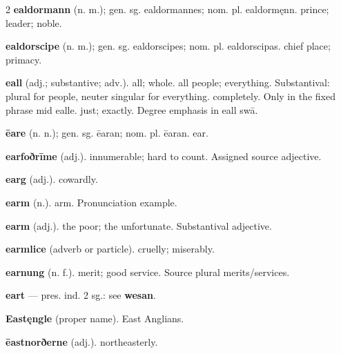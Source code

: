\begin{multicols*}{2}
\textbf{ealdormann} (n. m.); gen. sg. ealdormannes; nom. pl. ealdormęnn. prince; leader; noble.\par
\textbf{ealdorscipe} (n. m.); gen. sg. ealdorscipes; nom. pl. ealdorscipas. chief place; primacy.\par
\textbf{eall} (adj.; substantive; adv.). all; whole. all people; everything. Substantival: plural for people, neuter singular for everything. completely. Only in the fixed phrase mid ealle. just; exactly. Degree emphasis in eall swā.\par
\textbf{ēare} (n. n.); gen. sg. ēaran; nom. pl. ēaran. ear.\par
\textbf{earfoðrīme} (adj.). innumerable; hard to count. Assigned source adjective.\par
\textbf{earg} (adj.). cowardly.\par
\textbf{earm} (n.). arm. Pronunciation example.\par
\textbf{earm} (adj.). the poor; the unfortunate. Substantival adjective.\par
\textbf{earmlice} (adverb or particle). cruelly; miserably.\par
\textbf{earnung} (n. f.). merit; good service. Source plural merits/services.\par
\textbf{eart} — pres. ind. 2 sg.: see \textbf{wesan}.\par
\textbf{Eastęngle} (proper name). East Anglians.\par
\textbf{ēastnorðerne} (adj.). northeasterly.\par

\end{multicols*}
